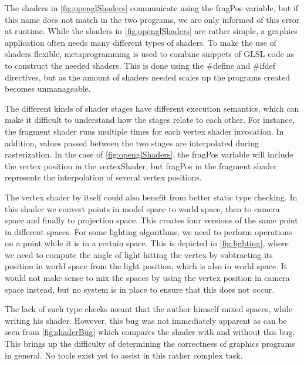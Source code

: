 The shaders in \cref{fig:openglShaders} communicate using the fragPos variable, but if this name does not match in the two programs, we are only informed of this error at runtime. 
While the shaders in \cref{fig:openglShaders} are rather simple, a graphics application often needs many different types of shaders. To make the use of shaders flexible, metaprogramming is used to combine snippets of \gls{GLSL} code as to construct the needed shaders. This is done using the \#define and \#ifdef directives, but as the amount of shaders needed scales up the programs created becomes unmanageable.


The different kinds of shader stages have different execution semantics, which can make it difficult to understand how the stages relate to each other.
For instance, the fragment shader runs multiple times for each vertex shader invocation.
In addition, values passed between the two stages are interpolated during rasterization.
In the case of \cref{fig:openglShaders}, the fragPos variable will include the vertex position in the vertexShader, but fragPos in the fragment shader represents the interpolation of several vertex positions.


The vertex shader by itself could also benefit from better static type checking. In this shader we convert points in model space to world space, then to camera space and finally to projection space.
This creates four versions of the same point in different spaces.
For some lighting algorithms, we need to perform operations on a point while it is in a certain space. 
This is depicted in \cref{fig:lighting}, where we need to compute the angle of light hitting the vertex by subtracting its position in world space from the light position, which is also in world space. 
It would not make sense to mix the spaces by using the vertex position in camera space instead, but no system is in place to ensure that this does not occur.


The lack of such type checks meant that the author himself mixed spaces, while writing his shader.
However, this bug was not immediately apparent as can be seen from \cref{fig:shaderBug} which compares the shader with and without this bug.
This brings up the difficulty of determining the correctness of graphics programs in general.
No tools exist yet to assist in this rather complex task. 
 

